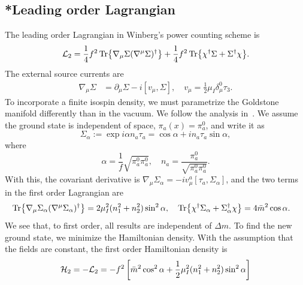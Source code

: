 \subsection{*Leading order Lagrangian}
\label{section: leading order}

The leading order Lagrangian in Winberg's power counting scheme is
%
\begin{equation}
    \label{leading order two flavor chpt lagrangian}
    \mathcal{L}_2 = 
    \frac{1}{4} f^2 \Tr{\nabla_\mu \Sigma (\nabla^\mu \Sigma)^\dagger}
    + \frac{1}{4} f^2 \Tr{\chi^\dagger \Sigma + \Sigma^\dagger \chi}.
\end{equation}
%
The external source currents are
\begin{align}
    \nabla_\mu \Sigma &= \partial_\mu \Sigma - i [v_\mu, \Sigma],
    \quad v_\mu = \frac{1}{2} \mu_I \delta_\mu^0 \tau_3.
\end{align}
To incorporate a finite isospin density, we must parametrize the Goldstone manifold differently than in the vacuum.
We follow the analysis in~\autocite{adhikariTwoflavorChiralPerturbation2019}.
We assume the ground state is independent of space, $\pi_a(x) = \pi_a^0$, and write it as
\begin{equation}
    \Sigma_\alpha 
    :=
    \exp{i \alpha n_a \tau_a}
    = 
    \cos \alpha + i n_a \tau_a \sin \alpha,
\end{equation}
%
where
\begin{equation}
    \alpha = \frac{1}{f} \sqrt{\pi^0_a \pi^0_a}, \quad
    n_a = \frac{\pi^0_a}{\sqrt{\pi^0_a \pi^0_a}}.
\end{equation}
%
With this, the covariant derivative is $\nabla_\mu \Sigma_\alpha = - iv^a_\mu [\tau_a, \Sigma_\alpha]$, and the two terms in the first order Lagrangian are
\begin{align}
    \Tr{\nabla_\mu \Sigma_\alpha  (\nabla^\mu \Sigma_\alpha)^\dagger}
    & = 2 \mu_I^2 (n_1^2 + n_2^2) \sin^2 \alpha, \quad
    \Tr{\chi^\dagger \Sigma_\alpha + \Sigma_\alpha^\dagger \chi}
    = 4 \bar m^2 \cos \alpha.
\end{align}
%
We see that, to first order, all results are independent of $\Delta m$.
To find the new ground state, we minimize the Hamiltonian density.
With the assumption that the fields are constant, the first order Hamiltonian density is
\begin{equation}
    \mathcal{H}_2 = - \mathcal{L}_2 = 
    - f^2 
    \left[
        \bar m^2 \cos^2 \alpha 
        + \frac{1}{2} \mu_I^2 (n_1^2 + n_2^2 ) \sin^2 \alpha
    \right]
\end{equation}
